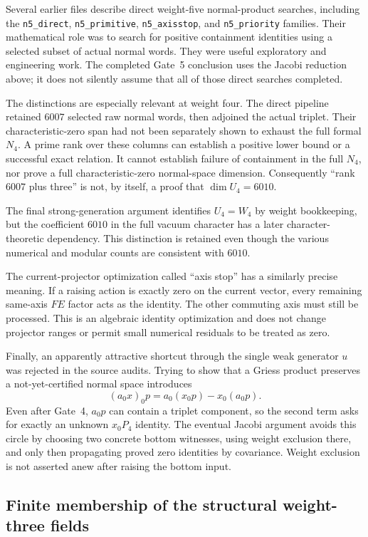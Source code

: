 Several earlier files describe direct weight-five normal-product
searches, including the \texttt{n5\_direct}, \texttt{n5\_primitive},
\texttt{n5\_axisstop}, and \texttt{n5\_priority} families. Their
mathematical role was to search for positive containment identities
using a selected subset of actual normal words. They were useful
exploratory and engineering work. The completed Gate~5 conclusion uses
the Jacobi reduction above; it does not silently assume that all of
those direct searches completed.

The distinctions are especially relevant at weight four. The direct
pipeline retained $6007$ selected raw normal words, then adjoined the
actual triplet. Their characteristic-zero span had not been separately
shown to exhaust the full formal $N_4$. A prime rank over these columns
can establish a positive lower bound or a successful exact relation.
It cannot establish failure of containment in the full $N_4$, nor
prove a full characteristic-zero normal-space dimension. Consequently
``rank $6007$ plus three'' is not, by itself, a proof that
$\dim U_4=6010$.

The final strong-generation argument identifies $U_4=W_4$ by weight
bookkeeping, but the coefficient $6010$ in the full vacuum character
has a later character-theoretic dependency. This distinction is retained
even though the various numerical and modular counts are consistent
with $6010$.

The current-projector optimization called ``axis stop'' has a similarly
precise meaning. If a raising action is exactly zero on the current
vector, every remaining same-axis $FE$ factor acts as the identity.
The other commuting axis must still be processed. This is an algebraic
identity optimization and does not change projector ranges or permit
small numerical residuals to be treated as zero.

Finally, an apparently attractive shortcut through the single weak
generator $u$ was rejected in the source audits. Trying to show that
a Griess product preserves a not-yet-certified normal space introduces
\[
 (a_0x)_0p=a_0(x_0p)-x_0(a_0p).
\]
Even after Gate~4, $a_0p$ can contain a triplet component, so the second
term asks for exactly an unknown $x_0P_4$ identity. The eventual Jacobi
argument avoids this circle by choosing two concrete bottom witnesses,
using weight exclusion there, and only then propagating proved zero
identities by covariance. Weight exclusion is not asserted anew after
raising the bottom input.

\subsection{Finite membership of the structural weight-three fields}
\label{expfinite:structural-membership}


